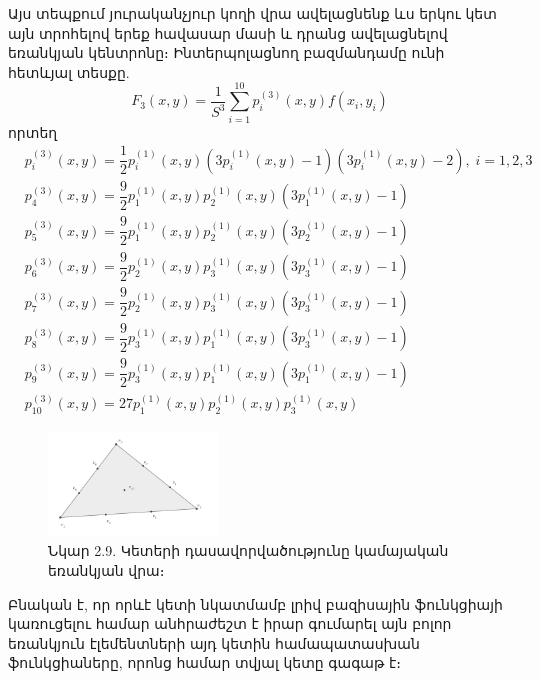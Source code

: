 \documentclass[fleqn, bachelor,subf,12pt,notitlepage]{article}
\begin{document}
\begin{enumerate}
Այս տեպքում յուրականչյուր կողի վրա ավելացնենք ևս երկու կետ այն տրոհելով երեք հավասար մասի  և դրանց ավելացնելով եռանկյան կենտրոնը։ Ինտերպոլացնող բազմանդամը ունի հետևյալ տեսքը.
\begin{equation}
F_{3}(x, y) = \dfrac{1}{S^{3}}\sum_{i=1}^{10} p^{(3)}_{i}(x,y)f(x_{i}, y_{i})
\end{equation}
որտեղ 
\begin{equation}
\begin{aligned}
&p^{(3)}_{i}(x,y) =  \dfrac{1}{2}p^{(1)}_{i}(x,y)\left(3 p^{(1)}_{i}(x,y)-1\right)\left(3 p^{(1)}_{i}(x,y)-2\right), \; i = 1, 2, 3 \\
&p^{(3)}_{4}(x,y) =  \dfrac{9}{2}p^{(1)}_{1}(x,y) p^{(1)}_{2}(x,y)\left(3 p^{(1)}_{1}(x,y)-1\right)\\
&p^{(3)}_{5}(x,y) =  \dfrac{9}{2}p^{(1)}_{1}(x,y) p^{(1)}_{2}(x,y)\left(3 p^{(1)}_{2}(x,y)-1\right)\\
&p^{(3)}_{6}(x,y) =  \dfrac{9}{2}p^{(1)}_{2}(x,y) p^{(1)}_{3}(x,y)\left(3 p^{(1)}_{3}(x,y)-1\right)\\
&p^{(3)}_{7}(x,y) =  \dfrac{9}{2}p^{(1)}_{2}(x,y) p^{(1)}_{3}(x,y)\left(3 p^{(1)}_{3}(x,y)-1\right) \\
&p^{(3)}_{8}(x,y) =  \dfrac{9}{2}p^{(1)}_{3}(x,y) p^{(1)}_{1}(x,y)\left(3 p^{(1)}_{3}(x,y)-1\right)\\
&p^{(3)}_{9}(x,y) =  \dfrac{9}{2}p^{(1)}_{3}(x,y) p^{(1)}_{1}(x,y)\left(3 p^{(1)}_{1}(x,y)-1\right) \\
&p^{(3)}_{10}(x,y) = 27p^{(1)}_{1}(x,y)p^{(1)}_{2}(x,y)p^{(1)}_{3}(x,y)
\end{aligned}
\end{equation}

\begin{figure}[H]
\centering
\includegraphics[width=0.4\textwidth]{images/cubic_on_triangular}
\captionsetup{labelformat=empty}
\caption{Նկար 2.9. Կետերի դասավորվածությունը կամայական եռանկյան վրա։}
\end{figure}

\end{enumerate}
Բնական է, որ որևէ կետի նկատմամբ լրիվ բազիսային ֆունկցիայի կառուցելու համար անհրաժեշտ է իրար գումարել այն բոլոր եռանկյուն էլեմենտների այդ կետին համապատասխան ֆունկցիաները, որոնց համար տվյալ կետը գագաթ է։
\newpage
\end{document}

